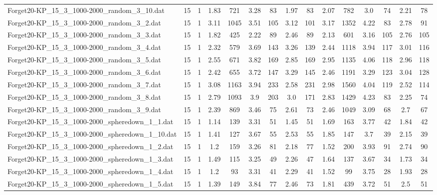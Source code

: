 \begin{table}[!ht]
{\begin{tabular}{lcccccccccccccc}
Forget20-KP\_15\_3\_1000-2000\_random\_3\_10.dat & 15 & 1 & 1.83 & 721 & 3.28 & 83 & 1.97 & 83 & 2.07 & 782 & 3.0 & 74 & 2.21 & 78 \\
Forget20-KP\_15\_3\_1000-2000\_random\_3\_2.dat & 15 & 1 & 3.11 & 1045 & 3.51 & 105 & 3.12 & 101 & 3.17 & 1352 & 4.22 & 83 & 2.78 & 91 \\
Forget20-KP\_15\_3\_1000-2000\_random\_3\_3.dat & 15 & 1 & 1.82 & 425 & 2.22 & 89 & 2.46 & 89 & 2.13 & 601 & 3.16 & 105 & 2.76 & 105 \\
Forget20-KP\_15\_3\_1000-2000\_random\_3\_4.dat & 15 & 1 & 2.32 & 579 & 3.69 & 143 & 3.26 & 139 & 2.44 & 1118 & 3.94 & 117 & 3.01 & 116 \\
Forget20-KP\_15\_3\_1000-2000\_random\_3\_5.dat & 15 & 1 & 2.55 & 671 & 3.82 & 169 & 2.85 & 169 & 2.95 & 1135 & 4.06 & 118 & 2.96 & 118 \\
Forget20-KP\_15\_3\_1000-2000\_random\_3\_6.dat & 15 & 1 & 2.42 & 655 & 3.72 & 147 & 3.29 & 145 & 2.46 & 1191 & 3.29 & 123 & 3.04 & 128 \\
Forget20-KP\_15\_3\_1000-2000\_random\_3\_7.dat & 15 & 1 & 3.08 & 1163 & 3.94 & 233 & 2.58 & 231 & 2.98 & 1560 & 4.04 & 119 & 2.52 & 114 \\
Forget20-KP\_15\_3\_1000-2000\_random\_3\_8.dat & 15 & 1 & 2.79 & 1093 & 3.9 & 203 & 3.0 & 171 & 2.83 & 1429 & 4.23 & 83 & 2.25 & 74 \\
Forget20-KP\_15\_3\_1000-2000\_random\_3\_9.dat & 15 & 1 & 2.39 & 869 & 3.46 & 75 & 2.61 & 73 & 2.46 & 1049 & 3.09 & 68 & 2.7 & 67 \\
Forget20-KP\_15\_3\_1000-2000\_spheredown\_1\_1.dat & 15 & 1 & 1.14 & 139 & 3.31 & 51 & 1.45 & 51 & 1.69 & 163 & 3.77 & 42 & 1.84 & 42 \\
Forget20-KP\_15\_3\_1000-2000\_spheredown\_1\_10.dat & 15 & 1 & 1.41 & 127 & 3.67 & 55 & 2.53 & 55 & 1.85 & 147 & 3.7 & 39 & 2.15 & 39 \\
Forget20-KP\_15\_3\_1000-2000\_spheredown\_1\_2.dat & 15 & 1 & 1.2 & 159 & 3.26 & 81 & 2.18 & 77 & 1.52 & 200 & 3.93 & 91 & 2.74 & 90 \\
Forget20-KP\_15\_3\_1000-2000\_spheredown\_1\_3.dat & 15 & 1 & 1.49 & 115 & 3.25 & 49 & 2.26 & 47 & 1.64 & 137 & 3.67 & 34 & 1.73 & 34 \\
Forget20-KP\_15\_3\_1000-2000\_spheredown\_1\_4.dat & 15 & 1 & 1.2 & 93 & 3.31 & 41 & 2.29 & 41 & 1.52 & 99 & 3.75 & 28 & 1.93 & 28 \\
Forget20-KP\_15\_3\_1000-2000\_spheredown\_1\_5.dat & 15 & 1 & 1.39 & 149 & 3.84 & 77 & 2.46 & 73 & 1.81 & 439 & 3.72 & 51 & 2.5 & 51 \\

\end{tabular}}
\end{table}
